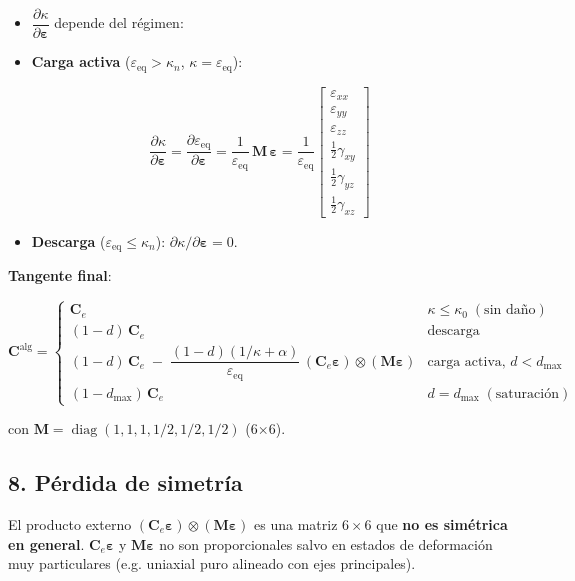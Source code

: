 \documentclass[11pt,letterpaper,oneside]{report}
\begin{document}
\begin{itemize}
  \item $\dfrac{\partial \kappa}{\partial \boldsymbol\varepsilon}$ depende del régimen:
  \item \textbf{Carga activa} ($\varepsilon_\text{eq} > \kappa_n$, $\kappa = \varepsilon_\text{eq}$):
\end{itemize}
    \[
\dfrac{\partial \kappa}{\partial \boldsymbol\varepsilon} = \dfrac{\partial \varepsilon_\text{eq}}{\partial \boldsymbol\varepsilon} = \dfrac{1}{\varepsilon_\text{eq}}\,\mathbf M\,\boldsymbol\varepsilon = \dfrac{1}{\varepsilon_\text{eq}}\begin{bmatrix}\varepsilon_{xx} \\ \varepsilon_{yy} \\ \varepsilon_{zz} \\ \tfrac{1}{2}\gamma_{xy} \\ \tfrac{1}{2}\gamma_{yz} \\ \tfrac{1}{2}\gamma_{xz}\end{bmatrix}
\]
\begin{itemize}
  \item \textbf{Descarga} ($\varepsilon_\text{eq} \leq \kappa_n$): $\partial \kappa / \partial \boldsymbol\varepsilon = 0$.
\end{itemize}

\textbf{Tangente final}:

\[
\mathbf C^\text{alg} = \begin{cases}
\mathbf C_e & \kappa \leq \kappa_0 \;(\text{sin daño}) \\
(1-d)\,\mathbf C_e & \text{descarga} \\
(1-d)\,\mathbf C_e \;-\; \dfrac{(1-d)(1/\kappa + \alpha)}{\varepsilon_\text{eq}}\,(\mathbf C_e\boldsymbol\varepsilon)\otimes(\mathbf M\boldsymbol\varepsilon) & \text{carga activa, } d < d_\text{max} \\
(1-d_\text{max})\,\mathbf C_e & d = d_\text{max} \;(\text{saturación})
\end{cases}
\]

con $\mathbf M = \operatorname{diag}(1, 1, 1, 1/2, 1/2, 1/2)$ (6\ensuremath{\times}6).

\subsection{8. Pérdida de simetría}

El producto externo $(\mathbf C_e\boldsymbol\varepsilon)\otimes(\mathbf M\boldsymbol\varepsilon)$ es una matriz $6\times 6$ que \textbf{no es simétrica en general}. $\mathbf C_e\boldsymbol\varepsilon$ y $\mathbf M\boldsymbol\varepsilon$ no son proporcionales salvo en estados de deformación muy particulares (e.g. uniaxial puro alineado con ejes principales).
\end{document}
